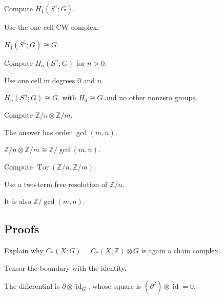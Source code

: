\begin{exercise}\label{exr:viii25-ped-02}
Compute $H_1(S^1;G)$.
\end{exercise}
\begin{hint}
Use the one-cell CW complex.
\end{hint}
\begin{solution}
$H_1(S^1;G)\cong G$.
\end{solution}

\begin{exercise}\label{exr:viii25-ped-03}
Compute $H_n(S^n;G)$ for $n>0$.
\end{exercise}
\begin{hint}
Use one cell in degrees $0$ and $n$.
\end{hint}
\begin{solution}
$H_n(S^n;G)\cong G$, with $H_0\cong G$ and no other nonzero groups.
\end{solution}

\begin{exercise}\label{exr:viii25-ped-04}
Compute $\mathbb Z/n\otimes\mathbb Z/m$.
\end{exercise}
\begin{hint}
The answer has order $\gcd(m,n)$.
\end{hint}
\begin{solution}
$\mathbb Z/n\otimes\mathbb Z/m\cong\mathbb Z/\gcd(m,n)$.
\end{solution}

\begin{exercise}\label{exr:viii25-ped-05}
Compute $\operatorname{Tor}(\mathbb Z/n,\mathbb Z/m)$.
\end{exercise}
\begin{hint}
Use a two-term free resolution of $\mathbb Z/n$.
\end{hint}
\begin{solution}
It is also $\mathbb Z/\gcd(m,n)$.
\end{solution}

\subsection*{Proofs}

\begin{exercise}\label{exr:viii25-ped-06}
Explain why $C_*(X;G)=C_*(X;\mathbb Z)\otimes G$ is again a chain complex.
\end{exercise}
\begin{hint}
Tensor the boundary with the identity.
\end{hint}
\begin{solution}
The differential is $\partial\otimes\operatorname{id}_G$, whose square is $(\partial^2)\otimes\operatorname{id}=0$.
\end{solution}

